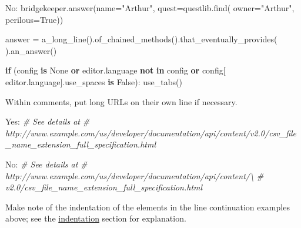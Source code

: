 \documentclass[
]{article}
\newenvironment{Shaded}{}{}
\newcommand{\CommentTok}[1]{\textcolor[rgb]{0.38,0.63,0.69}{\textit{#1}}}
\newcommand{\ControlFlowTok}[1]{\textcolor[rgb]{0.00,0.44,0.13}{\textbf{#1}}}
\newcommand{\KeywordTok}[1]{\textcolor[rgb]{0.00,0.44,0.13}{\textbf{#1}}}
\newcommand{\NormalTok}[1]{#1}
\newcommand{\OperatorTok}[1]{\textcolor[rgb]{0.40,0.40,0.40}{#1}}
\newcommand{\StringTok}[1]{\textcolor[rgb]{0.25,0.44,0.63}{#1}}
\newcommand{\VariableTok}[1]{\textcolor[rgb]{0.10,0.09,0.49}{#1}}
\begin{document}
\begin{samepage}
\begin{Shaded}
\begin{Highlighting}[]
\NormalTok{No: bridgekeeper.answer(name}\OperatorTok{=}\StringTok{"Arthur"}\NormalTok{, quest}\OperatorTok{=}\NormalTok{questlib.find(}
\NormalTok{        owner}\OperatorTok{=}\StringTok{"Arthur"}\NormalTok{, perilous}\OperatorTok{=}\VariableTok{True}\NormalTok{))}

\NormalTok{    answer }\OperatorTok{=}\NormalTok{ a\_long\_line().of\_chained\_methods().that\_eventually\_provides(}
\NormalTok{        ).an\_answer()}

    \ControlFlowTok{if}\NormalTok{ (config }\KeywordTok{is} \VariableTok{None} \KeywordTok{or} \StringTok{\textquotesingle{}editor.language\textquotesingle{}} \KeywordTok{not} \KeywordTok{in}\NormalTok{ config }\KeywordTok{or}\NormalTok{ config[}
        \StringTok{\textquotesingle{}editor.language\textquotesingle{}}\NormalTok{].use\_spaces }\KeywordTok{is} \VariableTok{False}\NormalTok{):}
\NormalTok{      use\_tabs()}
\end{Highlighting}
\end{Shaded}
\end{samepage}

Within comments, put long URLs on their own line if necessary.

\begin{samepage}
\begin{Shaded}
\begin{Highlighting}[]
\NormalTok{Yes:  }\CommentTok{\# See details at}
      \CommentTok{\# http://www.example.com/us/developer/documentation/api/content/v2.0/csv\_file\_name\_extension\_full\_specification.html}
\end{Highlighting}
\end{Shaded}
\end{samepage}

\begin{samepage}
\begin{Shaded}
\begin{Highlighting}[]
\NormalTok{No:  }\CommentTok{\# See details at}
     \CommentTok{\# http://www.example.com/us/developer/documentation/api/content/\textbackslash{}}
     \CommentTok{\# v2.0/csv\_file\_name\_extension\_full\_specification.html}
\end{Highlighting}
\end{Shaded}
\end{samepage}

Make note of the indentation of the elements in the line continuation
examples above; see the \hyperref[s3.4-indentation]{indentation} section
for explanation.
\end{document}
